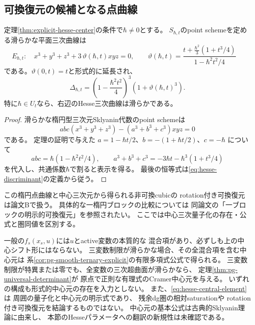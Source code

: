 \subsection{可換復元の候補となる点曲線}
\begin{proposition}[楕円点曲線のHesseパラメータ]
\label{prop:hesse-point-cubic}
定理\ref{thm:explicit-hesse-center}の条件で$\hbar\ne0$とする。
$S_{\hbar,t}$のpoint schemeを定める滑らかな平面三次曲線は
\begin{equation}
 E_{\hbar,t}:\quad
 x^3+y^3+z^3+3\,\vartheta(\hbar,t)xyz=0,
\quad
 \boxed{\quad
 \vartheta(\hbar,t)=
 \frac{t+\frac{\hbar^2}{3}(1+t^3/4)}
 {1-\hbar^2t^2/4}
 \quad}
 \label{eq:hesse-point-parameter}
\end{equation}
である。$\vartheta(0,t)=t$と形式的に延長され、
\begin{equation}
 \Delta_{\hbar,t}
 =\left(1-\frac{\hbar^2t^2}{4}\right)^3
  \left(1+\vartheta(\hbar,t)^3\right).
 \label{eq:hesse-point-delta}
\end{equation}
特に$\hbar\in U_t$なら、右辺のHesse三次曲線は滑らかである。
\end{proposition}
\begin{proof}
滑らかな楕円型三次元Sklyanin代数のpoint schemeは
\begin{equation}
 abc(x^3+y^3+z^3)-(a^3+b^3+c^3)xyz=0
\end{equation}
である\cite{SmithTate,DeLaetLeBruyn}。
定理の証明で与えた
$a=1-\hbar t/2$、$b=-(1+\hbar t/2)$、$c=-\hbar$
について
\begin{equation}
 abc=\hbar(1-\hbar^2t^2/4),\qquad
 a^3+b^3+c^3
 =-3\hbar t-\hbar^3(1+t^3/4)
\end{equation}
を代入し、共通係数$\hbar$で割ると表示を得る。
最後の恒等式は\eqref{eq:hesse-discriminant}の定義から従う。
\end{proof}
\begin{remark}[幾何学的比較との関係]
この楕円点曲線と中心三次元から得られる非可換cubicの
rotation付き可換復元は論文Bで扱う。
具体的な一楕円ブロックの比較については
同論文の「一ブロックの明示的可換復元」を参照されたい。
ここでは中心三次量子化の存在・公式と圏同値を区別する。
\end{remark}

\begin{remark}[適用範囲と新規性]
\label{rem:hesse-scope}
一般の$f_s(x_s,u)$には$u$とactive変数の本質的な
混合項があり、必ずしも上の中心シフト形にはならない。
三変数制限が滑らかな場合、その全混合項を含む中心元は
系\ref{cor:pg-smooth-ternary-explicit}の有限多項式公式で得られる。
三変数制限が特異または零でも、全変数の三次超曲面が滑らかなら、
定理\ref{thm:pg-universal-determinant}が
原点で正則な有理式のCramer中心元を与える。
いずれの構成も形式的中心元の存在を入力としない。
また、\eqref{eq:hesse-central-element}は
周囲の量子化と中心元の明示式であり、
残余dg圏の相対saturationや
rotation付き可換復元を結論するものではない。
中心元の基本公式は古典的Sklyanin理論に由来し、
本節のHesseパラメータへの翻訳の新規性は未確認である。
\end{remark}
